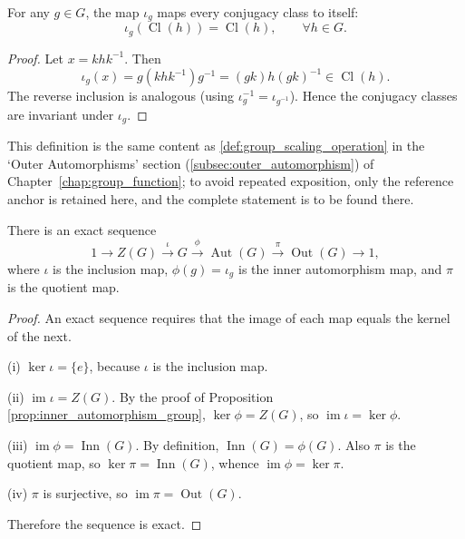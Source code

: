 \begin{proposition}\label{prop:inner_preserves_conjugacy}
For any $g\in G$, the map $\iota_g$ maps every conjugacy class to itself:
\[
\iota_g(\operatorname{Cl}(h)) = \operatorname{Cl}(h),\qquad \forall h\in G.
\]
\end{proposition}

\begin{proof}
Let $x = khk^{-1}$. Then
\[
\iota_g(x) = g(khk^{-1})g^{-1} = (gk)h(gk)^{-1} \in \operatorname{Cl}(h).
\]
The reverse inclusion is analogous (using $\iota_g^{-1}=\iota_{g^{-1}}$). Hence the conjugacy classes are invariant under $\iota_g$.
\end{proof}

\begin{definition}\label{def:higher_outer_automorphism}
This definition is the same content as \cref{def:group_scaling_operation} in the `Outer Automorphisms' section (\cref{subsec:outer_automorphism}) of Chapter~\ref{chap:group_function}; to avoid repeated exposition, only the reference anchor is retained here, and the complete statement is to be found there.
\end{definition}

\begin{proposition}\label{prop:automorphism_exact_sequence}
There is an exact sequence
\[
1 \longrightarrow Z(G) \xrightarrow{\ \iota\ } G \xrightarrow{\ \phi\ } \operatorname{Aut}(G) \xrightarrow{\ \pi\ } \operatorname{Out}(G) \longrightarrow 1,
\]
where $\iota$ is the inclusion map, $\phi(g)=\iota_g$ is the inner automorphism map, and $\pi$ is the quotient map.
\end{proposition}

\begin{proof}
An exact sequence requires that the image of each map equals the kernel of the next.

(i) $\ker\iota = \{e\}$, because $\iota$ is the inclusion map.

(ii) $\operatorname{im}\iota = Z(G)$. By the proof of Proposition \ref{prop:inner_automorphism_group}, $\ker\phi = Z(G)$, so $\operatorname{im}\iota = \ker\phi$.

(iii) $\operatorname{im}\phi = \operatorname{Inn}(G)$. By definition, $\operatorname{Inn}(G) = \phi(G)$. Also $\pi$ is the quotient map, so $\ker\pi = \operatorname{Inn}(G)$, whence $\operatorname{im}\phi = \ker\pi$.

(iv) $\pi$ is surjective, so $\operatorname{im}\pi = \operatorname{Out}(G)$.

Therefore the sequence is exact.
\end{proof}

